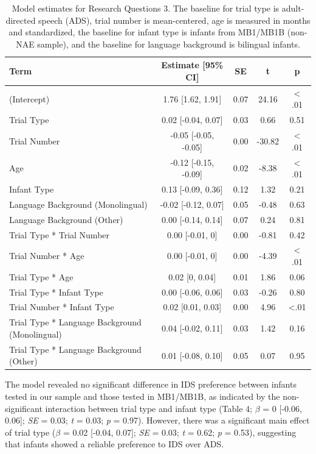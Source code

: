 \documentclass[
  ,man,floatsintext]{apa6}
\begin{document}
\begin{table}

\caption{Model estimates for Research Questions 3. The baseline for trial type is adult-directed speech (ADS), trial number is mean-centered, age is measured in months and standardized, the baseline for infant type is infants from MB1/MB1B (non-NAE sample), and the baseline for language background is bilingual infants.}
\centering
\begin{tabular}[t]{lcccc}
\toprule
Term & Estimate [95\% CI] & SE & t & p\\
\midrule
(Intercept) & 1.76 [1.62, 1.91] & 0.07 & 24.16 & < .01\\
Trial Type & 0.02 [-0.04, 0.07] & 0.03 & 0.66 & 0.51\\
Trial Number & -0.05 [-0.05, -0.05] & 0.00 & -30.82 & < .01\\
Age & -0.12 [-0.15, -0.09] & 0.02 & -8.38 & < .01\\
Infant Type & 0.13 [-0.09, 0.36] & 0.12 & 1.32 & 0.21\\
\addlinespace
Language Background (Monolingual) & -0.02 [-0.12, 0.07] & 0.05 & -0.48 & 0.63\\
Language Background (Other) & 0.00 [-0.14, 0.14] & 0.07 & 0.24 & 0.81\\
Trial Type * Trial Number & 0.00 [-0.01, 0] & 0.00 & -0.81 & 0.42\\
Trial Number * Age & 0.00 [-0.01, 0] & 0.00 & -4.39 & < .01\\
Trial Type * Age & 0.02 [0, 0.04] & 0.01 & 1.86 & 0.06\\
\addlinespace
Trial Type * Infant Type & 0.00 [-0.06, 0.06] & 0.03 & -0.26 & 0.80\\
Trial Number * Infant Type & 0.02 [0.01, 0.03] & 0.00 & 4.96 & <.01\\
Trial Type * Language Background (Monolingual) & 0.04 [-0.02, 0.11] & 0.03 & 1.42 & 0.16\\
Trial Type * Language Background (Other) & 0.01 [-0.08, 0.10] & 0.05 & 0.07 & 0.95\\
\bottomrule
\end{tabular}
\end{table}

The model revealed no significant difference in IDS preference between infants tested in our sample and those tested in MB1/MB1B, as indicated by the non-significant interaction between trial type and infant type (Table 4; \emph{\(\beta\)} = 0 {[}-0.06, 0.06{]}; \emph{SE} = 0.03; \emph{t} = 0.03; \emph{p} = 0.97). However, there was a significant main effect of trial type (\emph{\(\beta\)} = 0.02 {[}-0.04, 0.07{]}; \emph{SE} = 0.03; \emph{t} = 0.62; \emph{p} = 0.53), suggesting that infants showed a reliable preference to IDS over ADS.
\end{document}
